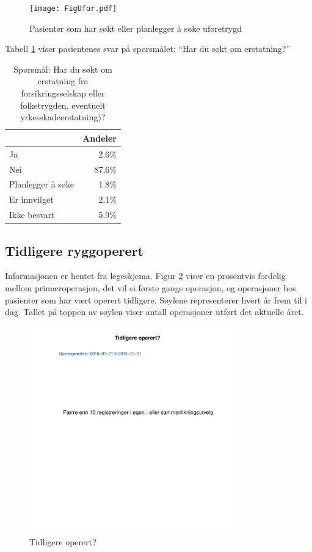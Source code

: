 \documentclass [norsk,a4paper,twoside]{article}\usepackage[]{graphicx}\usepackage[]{color}
\begin{document}
\begin{figure}[ht]
	\centering \texttt{[image: FigUfor.pdf]}
	\caption{\label{fig:Ufor} Pasienter som har søkt eller planlegger å søke uføretrygd} 
\end{figure}

Tabell \ref{tab:Erst} viser pasientenes svar på spørsmålet: ``Har du søkt om erstatning?'' 

\begin{table}[ht]
\centering
\begin{tabular}{lr}
  \hline
 & Andeler \\ 
  \hline
Ja & 2.6\% \\ 
  Nei & 87.6\% \\ 
  Planlegger å søke & 1.8\% \\ 
  Er innvilget & 2.1\% \\ 
  Ikke besvart & 5.9\% \\ 
   \hline
\end{tabular}
\caption{Spørsmål: Har du søkt om erstatning fra forsikringsselskap eller folketrygden, 
		eventuelt yrkesskadeerstatning)?} 
\label{tab:Erst}
\end{table}



\subsection{Tidligere ryggoperert}
Informasjonen er hentet fra legeskjema.
Figur \ref{fig:TidlOp} viser en prosentvis fordelig mellom primæroperasjon, det vil si første gangs 
operasjon, og operasjoner hos pasienter som har vært operert tidligere.  
Søylene representerer hvert år frem til i dag. Tallet på toppen av søylen viser antall operasjoner utført 
det aktuelle året.



\begin{figure}[ht]
\centering \includegraphics[width= 0.8\textwidth]{TidlOp.pdf}
\caption{\label{fig:TidlOp} Tidligere operert? }
\end{figure}
\end{document}
